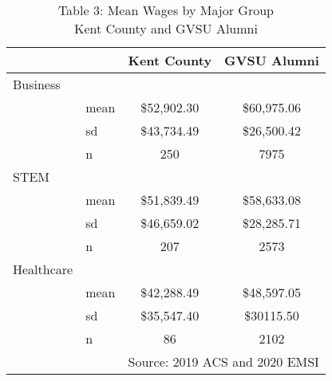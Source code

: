 \documentclass{article}
\begin{document}
\begin{table}[ht]
\centering
\caption*{Table 3: Mean Wages by Major Group \\Kent County and GVSU Alumni}
\begin{tabular}{llc|c}
	& & Kent County & GVSU Alumni\\
\hline
	Business & & & \\
	& mean & \$52,902.30 & \$60,975.06\\
	& sd & \$43,734.49 & \$26,500.42\\
	& n & 250 & 7975\\
\hline
STEM & & & \\
& mean & \$51,839.49 & \$58,633.08\\
& sd & \$46,659.02 & \$28,285.71\\
& n & 207 & 2573\\
\hline
Healthcare & & & \\
& mean & \$42,288.49 & \$48,597.05\\
& sd & \$35,547.40 & \$30115.50\\
& n & 86 & 2102\\
\hline
\multicolumn{4}{r}{\scriptsize{Source: 2019 ACS and 2020 EMSI}}	
\end{tabular}
\end{table}
\end{document}
